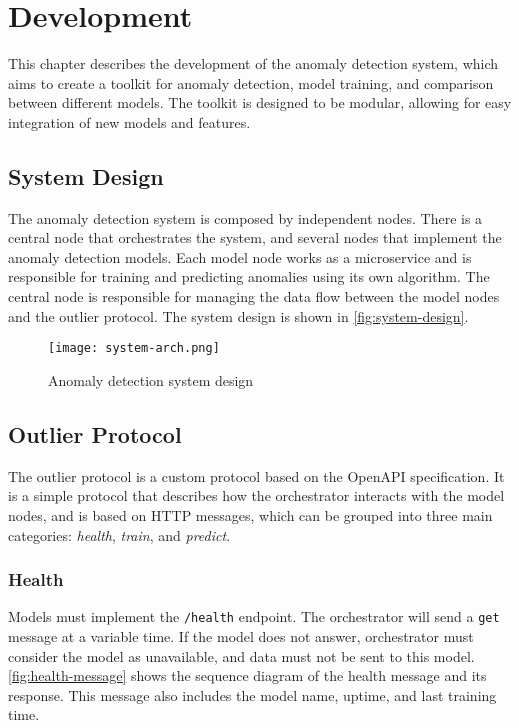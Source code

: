 \chapter{Development} \label{sec:cap3}

This chapter describes the development of the anomaly detection system, which aims to create a toolkit for anomaly detection, model training, and comparison between different models. The toolkit is designed to be modular, allowing for easy integration of new models and features.

\section{System Design}

The anomaly detection system is composed by independent nodes. There is a central node that orchestrates the system, and several nodes that implement the anomaly detection models. Each model node works as a microservice and is responsible for training and predicting anomalies using its own algorithm. The central node is responsible for managing the data flow between the model nodes and the outlier protocol. The system design is shown in \autoref{fig:system-design}.

\begin{figure}[H]
    \centering
    \texttt{[image: system-arch.png]}
    \caption{Anomaly detection system design}
    \label{fig:system-design}
\end{figure}

\section{Outlier Protocol}

The outlier protocol is a custom protocol based on the OpenAPI specification. It is a simple protocol that describes how the orchestrator interacts with the model nodes, and is based on HTTP messages, which can be grouped into three main categories: \textit{health}, \textit{train}, and \textit{predict}.

\subsection{Health}

Models must implement the \texttt{/health} endpoint. The orchestrator will send a \texttt{get} message at a variable time. If the model does not answer, orchestrator must consider the model as unavailable, and data must not be sent to this model. \autoref{fig:health-message} shows the sequence diagram of the health message and its response. This message also includes the model name, uptime, and last training time.

